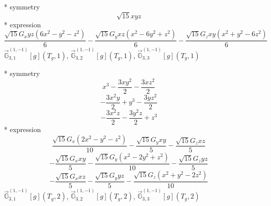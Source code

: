 \documentclass[fleqn,8pt]{jsarticle}
\begin{document}
\noindent\quad ** symmetry
\begin{dmath*}
\sqrt{15} x y z
\end{dmath*}
\noindent\quad ** expression
\begin{dmath*}
\frac{\sqrt{15} G_{x} y z \left(6 x^{2} - y^{2} - z^{2}\right)}{6} - \frac{\sqrt{15} G_{y} x z \left(x^{2} - 6 y^{2} + z^{2}\right)}{6} - \frac{\sqrt{15} G_{z} x y \left(x^{2} + y^{2} - 6 z^{2}\right)}{6}
\end{dmath*}
\noindent\quad $\vec{\mathbb{G}}_{3,1}^{(1,-1)}[g](T_{g},1)$, $\vec{\mathbb{G}}_{3,2}^{(1,-1)}[g](T_{g},1)$, $\vec{\mathbb{G}}_{3,3}^{(1,-1)}[g](T_{g},1)$

\noindent\quad ** symmetry
\begin{dmath*}
x^{3} - \frac{3 x y^{2}}{2} - \frac{3 x z^{2}}{2}
\end{dmath*}
\begin{dmath*}
- \frac{3 x^{2} y}{2} + y^{3} - \frac{3 y z^{2}}{2}
\end{dmath*}
\begin{dmath*}
- \frac{3 x^{2} z}{2} - \frac{3 y^{2} z}{2} + z^{3}
\end{dmath*}
\noindent\quad ** expression
\begin{dmath*}
\frac{\sqrt{15} G_{x} \left(2 x^{2} - y^{2} - z^{2}\right)}{10} - \frac{\sqrt{15} G_{y} x y}{5} - \frac{\sqrt{15} G_{z} x z}{5}
\end{dmath*}
\begin{dmath*}
- \frac{\sqrt{15} G_{x} x y}{5} - \frac{\sqrt{15} G_{y} \left(x^{2} - 2 y^{2} + z^{2}\right)}{10} - \frac{\sqrt{15} G_{z} y z}{5}
\end{dmath*}
\begin{dmath*}
- \frac{\sqrt{15} G_{x} x z}{5} - \frac{\sqrt{15} G_{y} y z}{5} - \frac{\sqrt{15} G_{z} \left(x^{2} + y^{2} - 2 z^{2}\right)}{10}
\end{dmath*}
\noindent\quad $\vec{\mathbb{G}}_{3,1}^{(1,-1)}[g](T_{g},2)$, $\vec{\mathbb{G}}_{3,2}^{(1,-1)}[g](T_{g},2)$, $\vec{\mathbb{G}}_{3,3}^{(1,-1)}[g](T_{g},2)$
\end{document}

